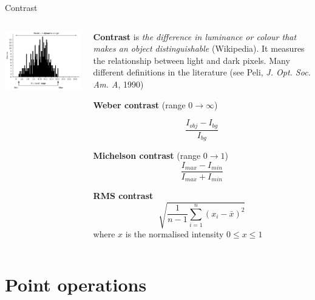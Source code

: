 \documentclass[9pt, aspectratio=169]{beamer}
\begin{document}
\begin{frame}
    {Contrast}
    \begin{columns}
        \begin{column}{.4\textwidth}
            \includegraphics[width=\textwidth]{contrast range.png}
        \end{column}
        \begin{column}{.6\textwidth}
            \textbf{Contrast} is \textit{the difference in luminance or colour that makes an object distinguishable} (Wikipedia). It measures the relationship between light and dark pixels.
            \pause
            Many different definitions in the literature (see Peli, \textit{J. Opt. Soc. Am. A}, 1990)

            \textbf{Weber contrast} (range $0 \rightarrow \infty$)

            $$\frac{I_{obj}-I_{bg}}{I_{bg}}$$

            \textbf{Michelson contrast} (range $0 \rightarrow 1$)
            $$\frac{I_{max}-I_{min}}{I_{max}+I_{min}}$$

            \textbf{RMS contrast}
            $$\sqrt{\frac{1}{n-1}\sum_{i=1}^{n}(x_i-\bar{x})^2}$$ where $x$ is the normalised intensity $0 \leq x \leq 1$

        \end{column}
    \end{columns}
\end{frame}

\section {Point operations}
\end{document}
